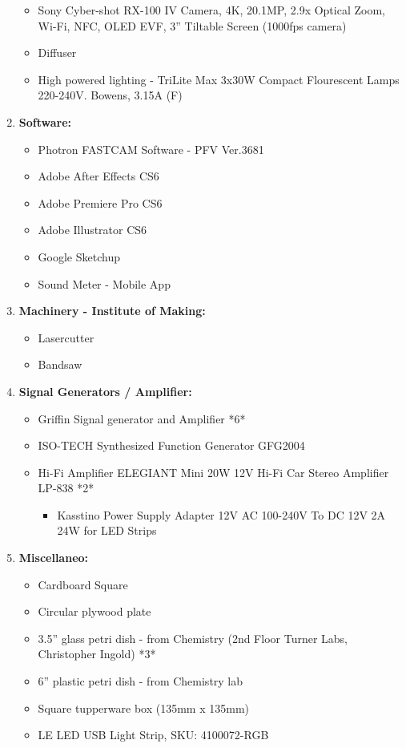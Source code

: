 \begin{enumerate}
\begin{itemize}
\item Sony Cyber-shot RX-100 IV Camera, 4K, 20.1MP, 2.9x Optical Zoom, Wi-Fi, NFC, OLED EVF, 3'' Tiltable Screen (1000fps camera)
\item Diffuser
\item High powered lighting - TriLite Max 3x30W Compact Flourescent Lamps 220-240V. Bowens, 3.15A (F)
\end{itemize}
\item \textbf{Software:}

\begin{itemize}
\item Photron FASTCAM Software - PFV Ver.3681
\item Adobe After Effects CS6
\item Adobe Premiere Pro CS6
\item Adobe Illustrator CS6
\item Google Sketchup
\item Sound Meter - Mobile App
\end{itemize}
\item \textbf{Machinery - Institute of Making:}

\begin{itemize}
\item Lasercutter
\item Bandsaw
\end{itemize}

\item \textbf{Signal Generators / Amplifier:}

\begin{itemize}
\item Griffin Signal generator and Amplifier *6*
\item ISO-TECH Synthesized Function Generator GFG2004 
\item Hi-Fi Amplifier ELEGIANT Mini 20W 12V Hi-Fi Car Stereo Amplifier LP-838 *2*

\begin{itemize}
\item Kasstino Power Supply Adapter 12V AC 100-240V To DC 12V 2A 24W for LED Strips
\end{itemize}
\end{itemize}
\item \textbf{Miscellaneo:}

\begin{itemize}
\item Cardboard Square
\item Circular plywood plate
\item 3.5'' glass petri dish - from Chemistry (2nd Floor Turner Labs, Christopher Ingold) *3*
\item 6'' plastic petri dish - from Chemistry lab 
\item Square tupperware box (135mm x 135mm)
\item LE LED USB Light Strip, SKU: 4100072-RGB


\end{itemize}
\end{enumerate}
